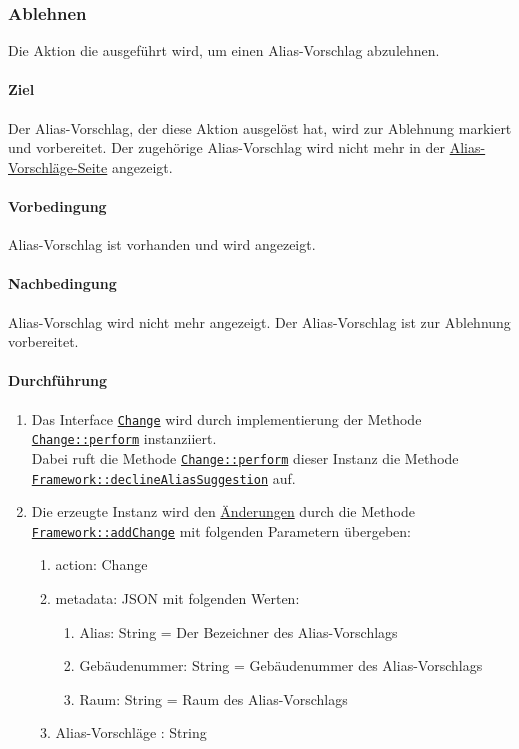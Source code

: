 \newpage
\subsubsection{Ablehnen}\label{AP_Aktionen_Alias_Vorschlage_Ablehnen}

Die Aktion die ausgeführt wird, um einen Alias-Vorschlag abzulehnen.

\paragraph*{Ziel}
Der Alias-Vorschlag, der diese Aktion ausgelöst hat, wird zur Ablehnung markiert und vorbereitet.
Der zugehörige Alias-Vorschlag wird nicht mehr in der \hyperref[AP_Alias_Vorschlage]{Alias-Vorschläge-Seite} angezeigt.

\paragraph*{Vorbedingung}
Alias-Vorschlag ist vorhanden und wird angezeigt.

\paragraph*{Nachbedingung}
Alias-Vorschlag wird nicht mehr angezeigt. Der Alias-Vorschlag ist zur Ablehnung vorbereitet.

\paragraph*{Durchführung}
\begin{enumerate}
    \item Das Interface \hyperref[AP_Change]{\texttt{Change}} wird durch implementierung der Methode \hyperref[AP_Change_perform]{\texttt{Change::perform}} instanziiert. \\
          Dabei ruft die Methode \hyperref[AP_Change_perform]{\texttt{Change::perform}} dieser Instanz die Methode \\
          \hyperref[AP_Framework_declineAliasSuggestion]{\texttt{Framework::declineAliasSuggestion}} auf.
    \item Die erzeugte Instanz wird den \hyperref[AP_Changes]{Änderungen} durch die Methode \hyperref[AP_Framework_addChange]{\texttt{Framework::addChange}} mit folgenden Parametern übergeben: \begin{enumerate}
        \item action: Change
        \item metadata: JSON mit folgenden Werten: \begin{enumerate}
            \item Alias: String = Der Bezeichner des Alias-Vorschlags
            \item Gebäudenummer: String = Gebäudenummer des Alias-Vorschlags
            \item Raum: String = Raum des Alias-Vorschlags
        \end{enumerate}
        \item \dq Alias-Vorschläge \dq: String
    \end{enumerate}
\end{enumerate}